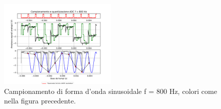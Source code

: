 \documentclass[journal]{IEEEtran}
\begin{document}
\vspace{-10mm}
%
\begin{figure}[H]%
\begin{center}
\includegraphics[trim={0 40 0 0}, clip,width=0.50\textwidth]{analysis/output/campionamento_800Hz.pdf}
\caption{Campionamento di forma d'onda sinusoidale f = 800 Hz, colori come nella figura precedente.}
\label{fig:sampSH6}
\end{center}
\end{figure}
\end{document}
